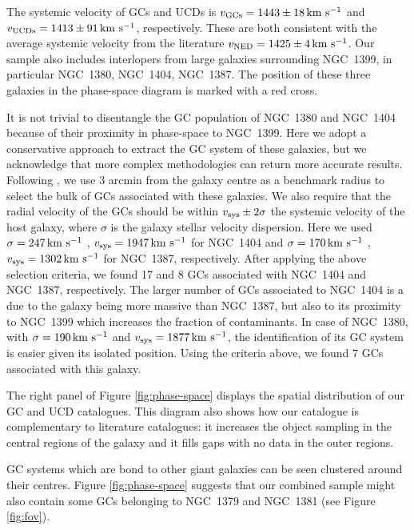 \documentclass[useAMS,usenatbib]{mn2e}
\newcommand{\kms}{\mbox{\,km~s$^{-1}$}}
\begin{document}
The systemic velocity of GCs and UCDs is $v_{\rm GCs} = 1443 \pm 18 \kms$ and 
$v_{\rm UCDs} = 1413 \pm 91 \kms$, respectively. These are both consistent with 
the average systemic velocity from the literature $v_{\rm NED} = 1425 \pm 4 
\kms$. Our sample also includes interlopers from large galaxies surrounding 
NGC~1399, in particular NGC~1380, NGC~1404, NGC~1387. The position of these 
three galaxies in the phase-space diagram is marked with a red cross. 

It is not trivial to disentangle the GC population of NGC~1380 and NGC~1404 
because of their proximity in phase-space to NGC~1399. 
Here we adopt a conservative approach to extract the GC system of these 
galaxies, but we acknowledge that more complex methodologies can return more 
accurate results. Following \citet{Schuberth}, we use 3 arcmin from the galaxy 
centre as a benchmark radius to select the bulk of GCs associated with these 
galaxies. We also require that the radial velocity of the GCs should be within 
$v_{\rm sys} \pm 2\sigma$  the systemic velocity of the host galaxy, where 
$\sigma$ is the galaxy stellar velocity dispersion. Here we used $\sigma = 247 
\kms$  \citep{Vanderbeke11}, $v_{\rm sys} = 1947 \kms$ for NGC~1404 and $\sigma 
= 170 \kms$ \citep{Wegner03}, $v_{\rm sys} = 1302\kms $ for NGC~1387, 
respectively. After applying the above selection criteria, we found 17 and 8 
GCs associated with NGC~1404 and NGC~1387, respectively. The larger number of 
GCs associated to NGC~1404 is a due to the galaxy being more massive than 
NGC~1387, but also to its proximity to NGC~1399 which increases the fraction of 
contaminants.
In case of NGC~1380, with $\sigma = 190 \kms$  \citep{Vanderbeke11} and $v_{\rm 
sys} = 1877 \kms$, the identification of its GC system is easier given its 
isolated position. Using the criteria above, we found 7 GCs associated with 
this galaxy. 

The right panel of Figure \ref{fig:phase-space} displays the spatial 
distribution of our GC and UCD catalogues. This diagram also shows how our 
catalogue is complementary to literature catalogues: it increases the object 
sampling in the central regions of the galaxy and it fills gaps with no data in 
the outer regions. 

GC systems which are bond to other giant galaxies can be seen clustered around 
their centres. Figure \ref{fig:phase-space} suggests that our combined sample 
might also contain some GCs belonging to NGC~1379 and NGC~1381 (see Figure 
\ref{fig:fov}). 
\end{document}
